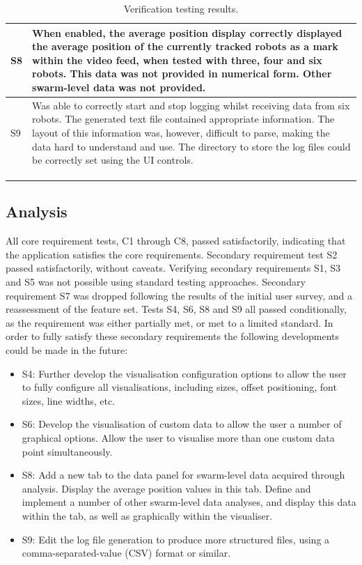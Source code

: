 \begin{longtable}{ l p{10cm} }
 S8 & When enabled, the average position display correctly displayed the average position of the currently tracked robots as a mark within the video feed, when tested with three, four and six robots. This data was not provided in numerical form. Other swarm-level data was not provided.\\\hline
 S9 & Was able to correctly start and stop logging whilst receiving data from six robots. The generated text file contained appropriate information. The layout of this information was, however, difficult to parse, making the data hard to understand and use. The directory to store the log files could be correctly set using the UI controls.\\\hline
 \bottomrule\\
 
 \caption[Verification Testing Results]{Verification testing results.}\\
 \label{tab:VerificationTestResults}
\end{longtable}

\subsection{Analysis}
All core requirement tests, C1 through C8, passed satisfactorily, indicating that the application satisfies the core requirements. Secondary requirement test S2 passed satisfactorily, without caveats. Verifying secondary requirements S1, S3 and S5 was not possible using standard testing approaches. Secondary requirement S7 was dropped following the results of the initial user survey, and a reassessment of the feature set. Tests S4, S6, S8 and S9 all passed conditionally, as the requirement was either partially met, or met to a limited standard. In order to fully satisfy these secondary requirements the following developments could be made in the future:

\begin{itemize}
 \item S4: Further develop the visualisation configuration options to allow the user to fully configure all visualisations, including sizes, offset positioning, font sizes, line widths, etc.
 \item S6: Develop the visualisation of custom data to allow the user a number of graphical options. Allow the user to visualise more than one custom data point simultaneously.
 \item S8: Add a new tab to the data panel for swarm-level data acquired through analysis. Display the average position values in this tab. Define and implement a number of other swarm-level data analyses, and display this data within the tab, as well as graphically within the visualiser.
 \item S9: Edit the log file generation to produce more structured files, using a comma-separated-value (CSV) format or similar.
\end{itemize}


